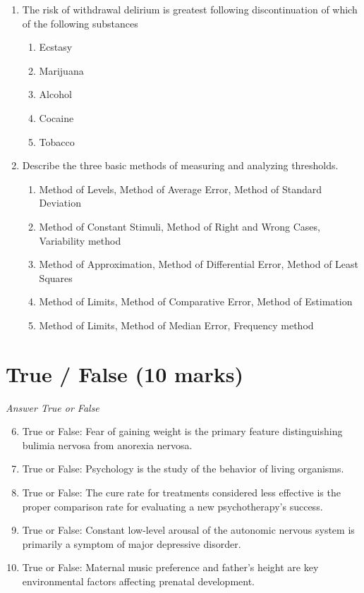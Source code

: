\documentclass[12pt]{article}
\begin{document}
\begin{enumerate}[label=\arabic*.]
\item The risk of withdrawal delirium is greatest following discontinuation of which of the following substances
\begin{enumerate}[label=(\alph*)]
    \item Ecstasy
    \item Marijuana
    \item Alcohol
    \item Cocaine
    \item Tobacco
\end{enumerate}
\item Describe the three basic methods of measuring and analyzing thresholds.
\begin{enumerate}[label=(\alph*)]
    \item Method of Levels, Method of Average Error, Method of Standard Deviation
    \item Method of Constant Stimuli, Method of Right and Wrong Cases, Variability method
    \item Method of Approximation, Method of Differential Error, Method of Least Squares
    \item Method of Limits, Method of Comparative Error, Method of Estimation
    \item Method of Limits, Method of Median Error, Frequency method
\end{enumerate}
\end{enumerate}

\section*{True / False (10 marks)}
\textit{Answer True or False}
\begin{enumerate}[label=\arabic*.]
\setcounter{enumi}{5}
\item True or False: Fear of gaining weight is the primary feature distinguishing bulimia nervosa from anorexia nervosa.
\item True or False: Psychology is the study of the behavior of living organisms.
\item True or False: The cure rate for treatments considered less effective is the proper comparison rate for evaluating a new psychotherapy's success.
\item True or False: Constant low-level arousal of the autonomic nervous system is primarily a symptom of major depressive disorder.
\item True or False: Maternal music preference and father's height are key environmental factors affecting prenatal development.
\end{enumerate}
\end{document}
